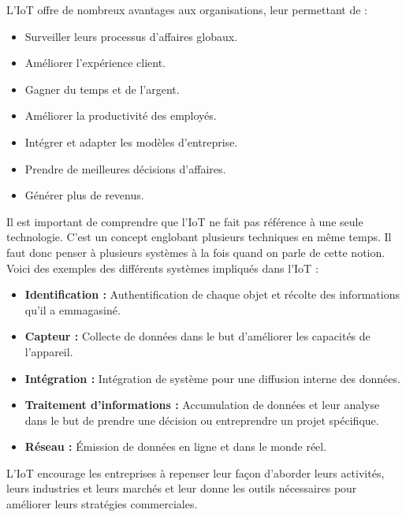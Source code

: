 \documentclass[french, a4paper, 12pt]{report}
\begin{document}
L'IoT offre de nombreux avantages aux organisations, leur permettant de :
\begin{itemize}
\item \textbf{}Surveiller leurs processus d'affaires globaux. 
\item \textbf{}Améliorer l'expérience client.
\item \textbf{}Gagner du temps et de l'argent. 
\item \textbf{}Améliorer la productivité des employés. 
\item \textbf{}Intégrer et adapter les modèles d'entreprise. 
\item \textbf{}Prendre de meilleures décisions d'affaires. 
\item \textbf{}Générer plus de revenus.
\end{itemize}
Il est important de comprendre que l’IoT ne fait pas référence à une seule technologie. C’est un concept englobant plusieurs techniques en même temps. Il faut donc penser à plusieurs systèmes à la fois quand on parle de cette notion.\\
Voici des exemples des différents systèmes impliqués dans l’IoT \cite{8}:
\begin{itemize}
\item \textbf{Identification :} Authentification de chaque objet et récolte des informations qu’il a emmagasiné.
\item \textbf{Capteur :} Collecte de données dans le but d’améliorer les capacités de l’appareil.
\item \textbf{Intégration : } Intégration de système pour une diffusion interne des données.
\item \textbf{Traitement d’informations :}  Accumulation de données et leur analyse dans le but de prendre une décision ou entreprendre un projet spécifique.
\item \textbf{Réseau :} Émission de données en ligne et dans le monde réel.
\end{itemize}

L'IoT encourage les entreprises à repenser leur façon d'aborder leurs activités, leurs industries et leurs marchés et leur donne les outils nécessaires pour améliorer leurs stratégies commerciales.
\end{document}
